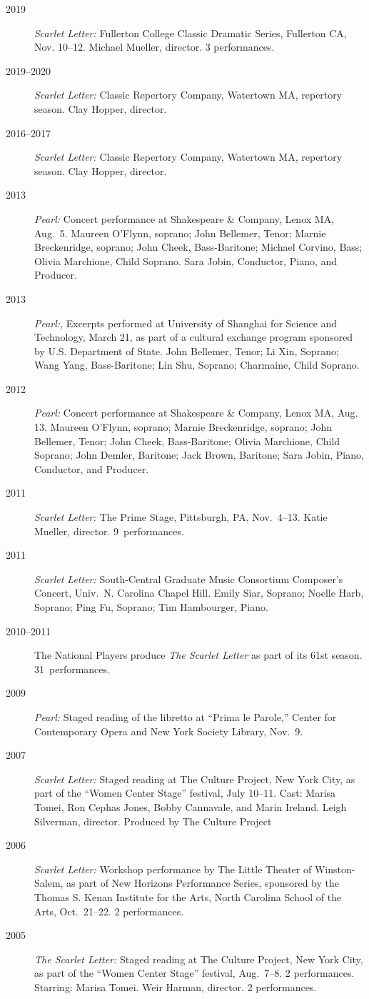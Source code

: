 \begin{description}
\item[2019] \emph{Scarlet Letter:\/} Fullerton College Classic Dramatic Series, Fullerton CA, Nov. 10--12. Michael Mueller, director. 3 performances.
\item[2019--2020] \emph{Scarlet Letter:\/} Classic Repertory Company, Watertown MA, repertory season. Clay Hopper, director.
\item[2016--2017] \emph{Scarlet Letter:\/} Classic Repertory Company, Watertown MA, repertory season. Clay Hopper, director.
\item[2013] \emph{Pearl:\/} Concert performance at Shakespeare \& Company, Lenox MA, Aug.~5.
  Maureen O'Flynn, soprano; John Bellemer, Tenor; Marnie Breckenridge, soprano; John Cheek, Bass-Baritone; Michael Corvino, Bass; 
  Olivia Marchione, Child Soprano. Sara Jobin, Conductor, Piano, and Producer.
\item[2013] \emph{Pearl:\/}, Excerpts performed at University of Shanghai for Science and Technology,  March 21, 
  as part of a cultural exchange program sponsored by U.S. Department of State. 
  John Bellemer, Tenor; Li Xin, Soprano; Wang Yang, Bass-Baritone; Lin Shu, Soprano; Charmaine, Child Soprano.
\item[2012] \emph{Pearl:\/} Concert performance at Shakespeare \& Company, Lenox MA, Aug. 13. 
  Maureen O'Flynn, soprano; Marnie Breckenridge, soprano; John Bellemer, Tenor; John Cheek, Bass-Baritone; 
  Olivia Marchione, Child Soprano; John Demler, Baritone; Jack Brown, Baritone; 
  Sara Jobin, Piano, Conductor, and Producer.
\item[2011] \emph{Scarlet Letter:\/} The Prime Stage, Pittsburgh, PA, Nov.~4--13. Katie Mueller, director. 9~performances.
\item[2011] \emph{Scarlet Letter:\/} South-Central Graduate Music Consortium Composer's Concert, Univ.\ N. Carolina Chapel Hill. 
  Emily Siar, Soprano; Noelle Harb, Soprano; Ping Fu, Soprano; Tim Hambourger, Piano.
\item[2010--2011] The National Players produce \textit{The Scarlet Letter\/} as part of its 61st season. 31~performances.
\item[2009] \emph{Pearl:\/} Staged reading of the libretto at ``Prima le Parole,'' Center for Contemporary Opera and New York Society Library, Nov.~9.
\item[2007] \emph{Scarlet Letter:\/} Staged reading at The Culture Project, New York City, as part of the ``Women Center Stage'' festival, July 10--11.
  Cast: Marisa Tomei, Ron Cephas Jones, Bobby Cannavale, and Marin Ireland.
  Leigh Silverman, director. Produced by The Culture Project 
\item[2006] \emph{Scarlet Letter:\/} Workshop performance by The Little Theater of Winston-Salem, as part of New Horizons Performance Series, 
  sponsored by the Thomas S. Kenan Institute for the Arts, North Carolina School of the Arts, Oct.~21--22. 2 performances.
\item[2005] \emph{The Scarlet Letter:\/} Staged reading at The Culture Project, New York City, as part of the ``Women Center Stage'' festival, 
  Aug.\ 7--8. 2 performances.
  Starring: Marisa Tomei.
  Weir Harman, director. 2 performances.
\end{description}